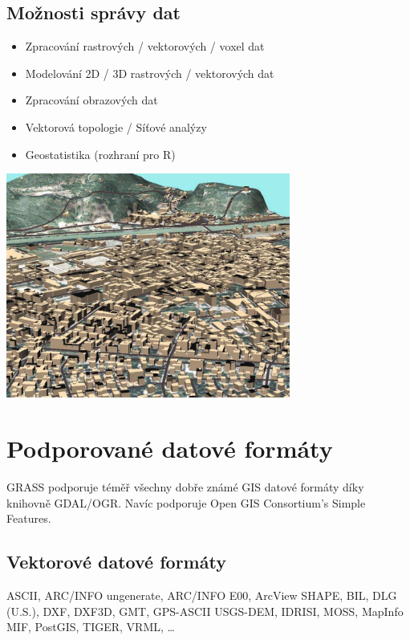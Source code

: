 \documentclass[notumble,a4paper,10pt,nofoldmark]{leaflet}
\newenvironment{myfig}[1][0pt plus 1.5ex minus
.5ex]{\par\vspace*{#1}\begin{minipage}{\textwidth}\centering}{\end{minipage}}
\begin{document}
\subsection{Možnosti správy dat}

\begin{itemize}
\item Zpracování rastrových / vektorových / voxel dat
\item Modelování 2D / 3D rastrových / vektorových dat
\item Zpracování obrazových dat
\item Vektorová topologie / Síťové analýzy
\item Geostatistika (rozhraní pro R)
\end{itemize}

\begin{myfig}[1ex]
\includegraphics[width=0.7\textwidth]{trento3d}
\end{myfig}

\section{Podporované datové formáty}

GRASS podporuje téměř všechny dobře známé GIS datové formáty díky
knihovně GDAL/OGR. Navíc podporuje Open GIS Consortium's Simple
Features.

\subsection{Vektorové datové formáty}
ASCII, ARC/INFO ungenerate, ARC/INFO E00, Arc\-View SHAPE, BIL, DLG
(U.S.), DXF, DXF3D, GMT, GPS-ASCII USGS-DEM, IDRISI, MOSS, MapInfo
MIF, PostGIS, TIGER, VRML, \dots
\end{document}
